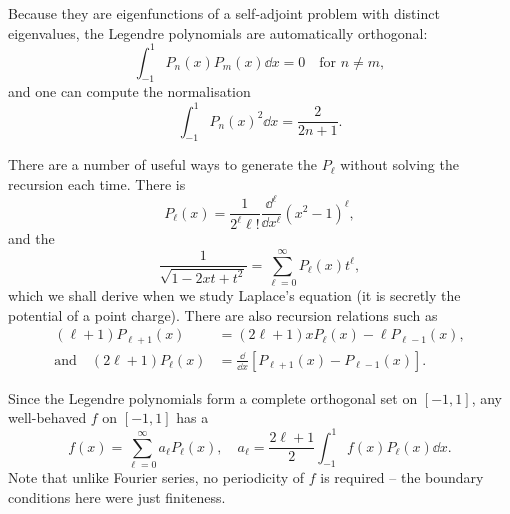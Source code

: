 \begin{center}
\end{center}

Because they are eigenfunctions of a self-adjoint problem with distinct eigenvalues, the Legendre polynomials are automatically orthogonal:
$$
\int_{-1}^1 P_n(x) P_m(x) \dd x = 0 \quad \text{for } n \neq m,
$$
and one can compute the normalisation
$$
\int_{-1}^1 P_n(x)^2 \dd x = \frac{2}{2n + 1}.
$$

There are a number of useful ways to generate the $P_\ell$ without solving the recursion each time. There is 
$$
P_\ell(x) = \frac{1}{2^\ell \ell!} \frac{\dd^\ell}{\dd x^\ell} (x^2 - 1)^\ell,
$$
and the 
$$
\frac{1}{\sqrt{1 - 2xt + t^2}} = \sum_{\ell = 0}^{\infty} P_\ell(x) t^\ell,
$$
which we shall derive when we study Laplace's equation (it is secretly the potential of a point charge). There are also recursion relations such as
\begin{align*}
(\ell + 1) P_{\ell + 1}(x) &= (2\ell + 1) x P_\ell(x) - \ell P_{\ell - 1}(x), \\
\text{and} \quad (2 \ell + 1) P_\ell(x) &= \frac{\dd}{\dd x}\left[P_{\ell + 1}(x) - P_{\ell - 1}(x)\right].
\end{align*}

Since the Legendre polynomials form a complete orthogonal set on $[-1, 1]$, any well-behaved $f$ on $[-1, 1]$ has a 
$$
f(x) = \sum_{\ell = 0}^{\infty} a_\ell P_\ell(x), \quad a_\ell = \frac{2 \ell + 1}{2} \int_{-1}^1 f(x) P_\ell(x) \dd x.
$$
Note that unlike Fourier series, no periodicity of $f$ is required -- the boundary conditions here were just finiteness.

